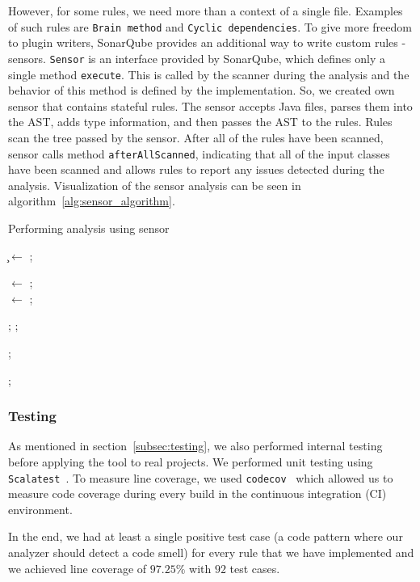 However, for some rules, we need more than a context of a single file.
Examples of such rules are \verb|Brain method| and \verb|Cyclic dependencies|.
To give more freedom to plugin writers, SonarQube provides an additional way to write custom rules - sensors.
\verb|Sensor| is an interface provided by SonarQube, which defines only a single method \verb|execute|.
This is called by the scanner during the analysis and the behavior of this method is defined by the implementation.
So, we created own sensor that contains stateful rules.
The sensor accepts Java files, parses them into the AST, adds type information, and then passes the AST to the rules.
Rules scan the tree passed by the sensor.
After all of the rules have been scanned, sensor calls method \verb|afterAllScanned|, indicating that all of the
input classes have been scanned and allows rules to report any issues detected during the analysis.
Visualization of the sensor analysis can be seen in algorithm~\ref{alg:sensor_algorithm}.

\begin{algorithm} [!htb]
    \caption{Performing analysis using sensor}
    \label{alg:sensor_algorithm}
    \BlankLine

    \c$\leftarrow$ \CreateClassPath; \\

     {
    \AST$\leftarrow$ \ParseJavaFile { \j }; \\
    \AstWithSymbolicModel$\leftarrow$ \UpdateSymbolicModel{\j, \c};

     {
    \Scan{\r, \AstWithSymbolicModel};
    };
    }

     {
    \AfterAllScanned{};
    }

    \UploadResults{};
\end{algorithm}

\FloatBarrier

\subsubsection{Testing}

As mentioned in section~\ref{subsec:testing}, we also performed internal testing before applying the tool to real projects.
We performed unit testing using \verb|Scalatest|~\cite{scalatest}.
To measure line coverage, we used \verb|codecov|~\cite{codecov} which allowed us to measure
code coverage during every build in the continuous integration (CI) environment.

In the end, we had at least a single positive test case (a code pattern where our analyzer should detect a code smell)
for every rule that we have implemented and we achieved line coverage of $97.25\%$ with $92$ test cases.
